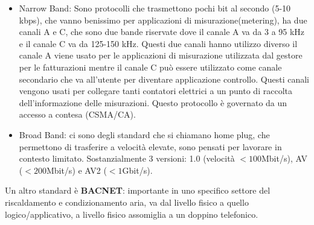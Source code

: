 \documentclass[11pt, twocolumn]{article}
\begin{document}
\begin{itemize}[wide,noitemsep,topsep=0ex]
  \item Narrow Band: Sono protocolli che trasmettono pochi bit al secondo (5-10 kbps), che vanno benissimo per applicazioni di misurazione(metering), ha due canali A e C, che sono due bande riservate dove il canale A va da 3 a 95 kHz e il canale C va da 125-150 kHz.
  Questi due canali hanno utilizzo diverso il canale A viene usato per le applicazioni di misurazione utilizzata dal gestore per le fatturazioni mentre il canale C può essere utilizzato come canale secondario che va all'utente per diventare applicazione controllo.
  Questi canali vengono usati per collegare tanti contatori elettrici a un punto di raccolta dell'informazione delle misurazioni.
  Questo protocollo è governato da un accesso a contesa (CSMA/CA). 
  \item Broad Band: ci sono degli standard che si chiamano home plug, che permettono di trasferire a velocità elevate, sono pensati per lavorare in contesto limitato.
  Sostanzialmente 3 versioni: 1.0 (velocità $<100$Mbit/s), AV ($<200$Mbit/s) e AV2 ($<1$Gbit/s). 
\end{itemize}
Un altro standard è \textbf{BACNET}: importante in uno specifico settore del riscaldamento e condizionamento aria, va dal livello fisico a quello logico/applicativo, a livello fisico assomiglia a un doppino telefonico.
\end{document}
